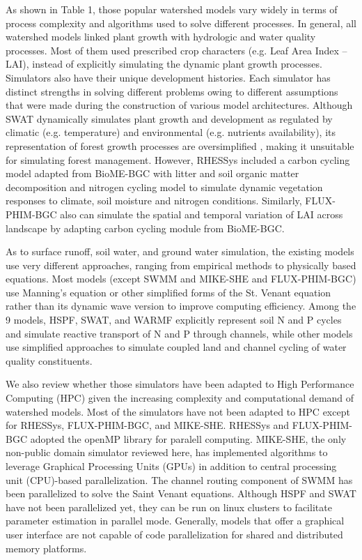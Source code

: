 \documentclass[preprint,review, 12pt]{elsarticle}
\begin{document}
As shown in Table 1, those popular watershed models vary widely in terms of process complexity and algorithms used to solve different processes. In general, all watershed models linked plant growth with hydrologic and water quality processes. Most of them used prescribed crop characters (e.g. Leaf Area Index -- LAI), instead of explicitly simulating the dynamic plant growth processes. Simulators also have their unique development histories. Each simulator has distinct strengths in solving different problems owing to different assumptions that were made during the construction of various model architectures. Although SWAT dynamically simulates plant growth and development as regulated by climatic (e.g. temperature) and environmental (e.g. nutrients availability), its representation of forest growth processes are oversimplified \citep{Yang2016}, making it unsuitable for simulating forest management. However, RHESSys \citep{Tague2004d} included a carbon cycling model adapted from BioME-BGC \citep{thornton1998regional} with litter and soil organic matter decomposition and nitrogen cycling model \citep{parton1996generalized} to simulate dynamic vegetation responses to climate, soil moisture and nitrogen conditions. Similarly, FLUX-PHIM-BGC \citep{Shi2018} also can simulate the spatial and temporal variation of LAI across landscape by adapting carbon cycling module from BioME-BGC.

As to surface runoff, soil water, and ground water simulation, the existing models use very different approaches, ranging from empirical methods to physically based equations. Most models (except SWMM and MIKE-SHE and FLUX-PHIM-BGC) use Manning’s equation or other simplified forms of the St. Venant equation rather than its dynamic wave version to improve computing efficiency. Among the 9 models, HSPF, SWAT, and WARMF explicitly represent soil N and P cycles and simulate reactive transport of N and P through channels, while other models use simplified approaches to simulate coupled land and channel cycling of water quality constituents. 

We also review whether those simulators have been adapted to High Performance Computing (HPC) given the increasing complexity and computational demand of watershed models. Most of the simulators have not been adapted to HPC except for RHESSys, FLUX-PHIM-BGC, and MIKE-SHE. RHESSys and FLUX-PHIM-BGC adopted the openMP library for paralell computing. MIKE-SHE, the only non-public domain simulator reviewed here, has implemented algorithms to leverage Graphical Processing Units (GPUs) in addition to central processing unit (CPU)-based parallelization. The channel routing component of SWMM has been parallelized to solve the Saint Venant equations. Although HSPF and SWAT have not been parallelized yet, they can be run on linux clusters to facilitate parameter estimation in parallel mode. Generally, models that offer a graphical user interface are not capable of code parallelization for shared and distributed memory platforms. 
\end{document}
